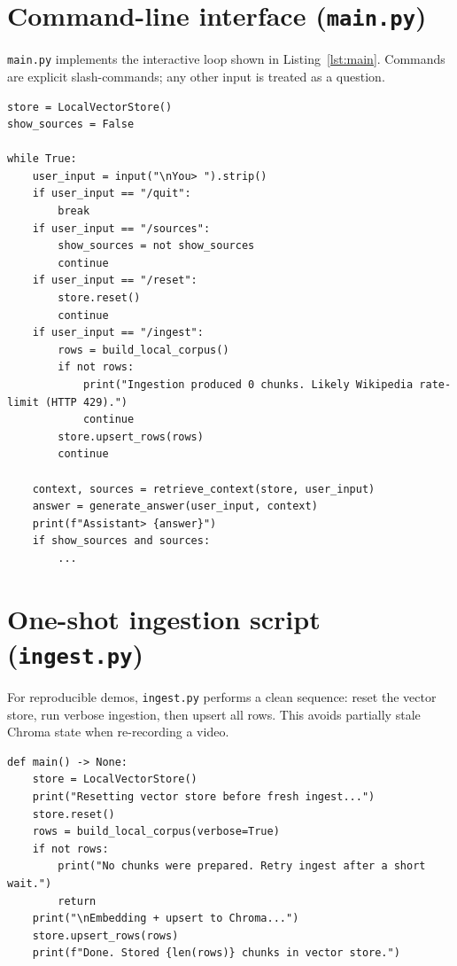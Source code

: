 \documentclass[11pt,a4paper]{article}
\begin{document}
\section{Command-line interface (\texttt{main.py})}

\texttt{main.py} implements the interactive loop shown in Listing~\ref{lst:main}.
Commands are explicit slash-commands; any other input is treated as a question.

\begin{lstlisting}[caption={CLI control flow (\texttt{main.py}, excerpt).},label={lst:main}]
store = LocalVectorStore()
show_sources = False

while True:
    user_input = input("\nYou> ").strip()
    if user_input == "/quit":
        break
    if user_input == "/sources":
        show_sources = not show_sources
        continue
    if user_input == "/reset":
        store.reset()
        continue
    if user_input == "/ingest":
        rows = build_local_corpus()
        if not rows:
            print("Ingestion produced 0 chunks. Likely Wikipedia rate-limit (HTTP 429).")
            continue
        store.upsert_rows(rows)
        continue

    context, sources = retrieve_context(store, user_input)
    answer = generate_answer(user_input, context)
    print(f"Assistant> {answer}")
    if show_sources and sources:
        ...
\end{lstlisting}

\section{One-shot ingestion script (\texttt{ingest.py})}

For reproducible demos, \texttt{ingest.py} performs a clean sequence: reset the vector store,
run verbose ingestion, then upsert all rows. This avoids partially stale Chroma state when
re-recording a video.

\begin{lstlisting}[caption={Batch ingest entrypoint (\texttt{ingest.py}).},label={lst:ingest}]
def main() -> None:
    store = LocalVectorStore()
    print("Resetting vector store before fresh ingest...")
    store.reset()
    rows = build_local_corpus(verbose=True)
    if not rows:
        print("No chunks were prepared. Retry ingest after a short wait.")
        return
    print("\nEmbedding + upsert to Chroma...")
    store.upsert_rows(rows)
    print(f"Done. Stored {len(rows)} chunks in vector store.")
\end{lstlisting}
\end{document}
